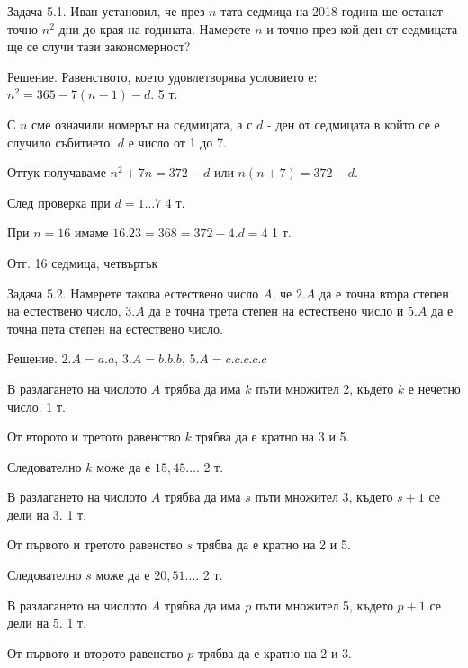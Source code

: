 
Задача 5.1. Иван установил, че през $n$-тата седмица на 2018 година ще останат точно $n^2$ дни до края на годината. Намерете $n$ и точно през кой ден от седмицата ще се случи тази закономерност?

Решение. Равенството, което удовлетворява условието е: $n^2=365-7(n-1)-d$. \hfill 5 т.

С $n$ сме означили номерът на седмицата, а с $d$ - ден от седмицата в който се е случило събитието. $d$ е число от 1 до 7.

Оттук получаваме $n^2+7n=372-d$ или $n(n+7)=372-d$.

След проверка при $d=1\ldots 7$ \hfill 4 т.

При $n=16$ имаме $16.23=368=372-4.d=4$ \hfill 1 т.

Отг. 16 седмица, четвъртък

Задача 5.2. Намерете такова естествено число $A$, че $2.A$ да е точна втора степен на естествено число, $3.A$ да е точна трета степен на естествено число и $5.A$ да е точна пета степен на естествено число.

Решение. $2.A=a.a$, $3.A=b.b.b$, $5.A=c.c.c.c.c$

В разлагането на числото $A$ трябва да има $k$ пъти множител 2, където $k$ е нечетно число. \hfill 1 т.

От второто и третото равенство $k$ трябва да е кратно на 3 и 5.

Следователно $k$ може да е $15,45\ldots$. \hfill 2 т.

В разлагането на числото $A$ трябва да има $s$ пъти множител 3, където $s+1$ се дели на 3. \hfill 1 т.

От първото и третото равенство $s$ трябва да е кратно на 2 и 5.

Следователно $s$ може да е $20,51\ldots$. \hfill 2 т.

В разлагането на числото $A$ трябва да има $p$ пъти множител 5, където $p+1$ се дели на 5. \hfill 1 т.

От първото и второто равенство $p$ трябва да е кратно на 2 и 3.

